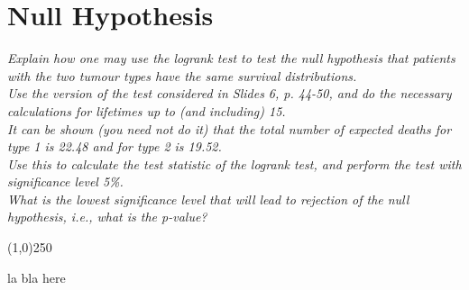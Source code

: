 \section{Null Hypothesis}
\textit{Explain how one may use the logrank test to test the null hypothesis that patients with the two tumour types have the same survival distributions.\\
Use the version of the test considered in Slides 6, p. 44-50, and do the necessary calculations for lifetimes up to (and including) 15.\\
It can be shown (you need not do it) that the total number of expected deaths for type 1 is 22.48 and for type 2 is 19.52.\\
Use this to calculate the test statistic of the logrank test, and perform the test with significance level 5\%.\\
What is the lowest significance level that will lead to rejection of the null hypothesis, i.e., what is the p-value?}
\begin{center}
\line(1,0){250}
\end{center}
la bla here

